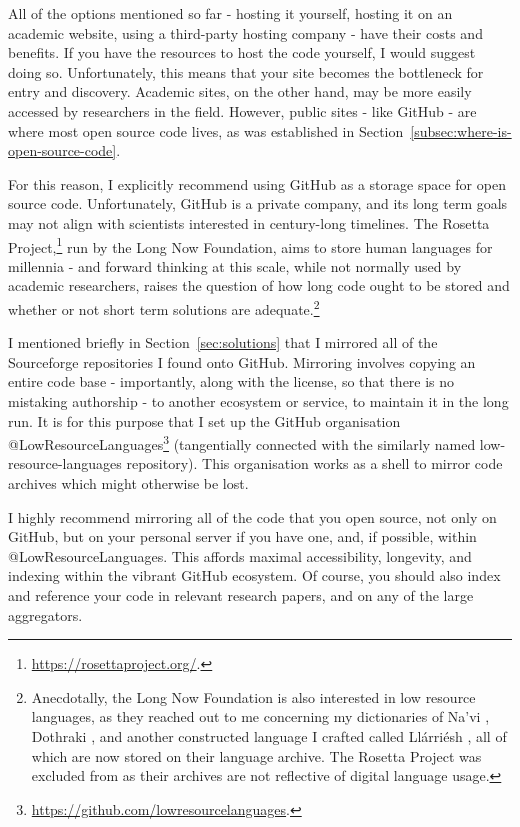 All of the options mentioned so far - hosting it yourself, hosting it on an academic website, using a third-party hosting company - have their costs and benefits. If you have the resources to host the code yourself, I would suggest doing so. Unfortunately, this means that your site becomes the bottleneck for entry and discovery. Academic sites, on the other hand, may be more easily accessed by researchers in the field. However, public sites - like GitHub - are where most open source code lives, as was established in Section~\ref{subsec:where-is-open-source-code}.

For this reason, I explicitly recommend using GitHub as a storage space for open source code. Unfortunately, GitHub is a private company, and its long term goals may not align with scientists interested in century-long timelines. The Rosetta Project,\footnote{\href{https://rosettaproject.org/}{https://rosettaproject.org/}. } run by the Long Now Foundation, aims to store human languages for millennia - and forward thinking at this scale, while not normally used by academic researchers, raises the question of how long code ought to be stored and whether or not short term solutions are adequate.\footnote{Anecdotally, the Long Now Foundation is also interested in low resource languages, as they reached out to me concerning my dictionaries of Na'vi \citep{navidictionary}, Dothraki \citep{dothrakidictionary}, and another constructed language I crafted called Ll\'arri\'esh \citep{littauerllarriesh}, all of which are now stored on their language archive. The Rosetta Project was excluded from \citet{kornai2013digital} as their archives are not reflective of digital language usage.}

I mentioned briefly in Section~\ref{sec:solutions} that I mirrored all of the Sourceforge repositories I found onto GitHub. Mirroring involves copying an entire code base - importantly, along with the license, so that there is no mistaking authorship - to another ecosystem or service, to maintain it in the long run. It is for this purpose that I set up the GitHub organisation @LowResourceLanguages\footnote{\href{https://github.com/lowresourcelanguages}{https://github.com/lowresourcelanguages}. } (tangentially connected with the similarly named low-resource-languages repository). This organisation works as a shell to mirror code archives which might otherwise be lost.

I highly recommend mirroring all of the code that you open source, not only on GitHub, but on your personal server if you have one, and, if possible, within @LowResourceLanguages. This affords maximal accessibility, longevity, and indexing within the vibrant GitHub ecosystem. Of course, you should also index and reference your code in relevant research papers, and on any of the large aggregators.


